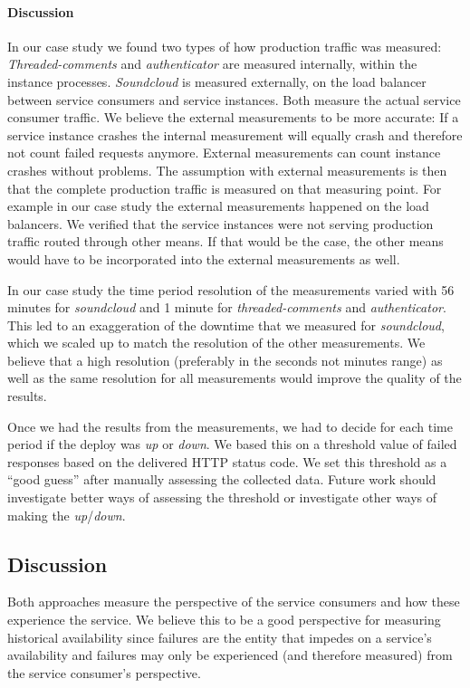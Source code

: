 \paragraph{Discussion}

In our case study we found two types of how production traffic was measured: \emph{Threaded-comments} and \emph{authenticator} are measured internally, within the instance processes. \emph{Soundcloud} is measured externally, on the load balancer between service consumers and service instances. Both measure the actual service consumer traffic. We believe the external measurements to be more accurate: If a service instance crashes the internal measurement will equally crash and therefore not count failed requests anymore. External measurements can count instance crashes without problems. The assumption with external measurements is then that the complete production traffic is measured on that measuring point. For example in our case study the external measurements happened on the load balancers. We verified that the service instances were not serving production traffic routed through other means. If that would be the case, the other means would have to be incorporated into the external measurements as well.

In our case study the time period resolution of the measurements varied with 56 minutes for \emph{soundcloud} and 1 minute for \emph{threaded-comments} and \emph{authenticator}. This led to an exaggeration of the downtime that we measured for \emph{soundcloud}, which we scaled up to match the resolution of the other measurements. We believe that a high resolution (preferably in the seconds not minutes range) as well as the same resolution for all measurements would improve the quality of the results.

Once we had the results from the measurements, we had to decide for each time period if the deploy was \emph{up} or \emph{down}. We based this on a threshold value of failed responses based on the delivered HTTP status code. We set this threshold as a ``good guess'' after manually assessing the collected data. Future work should investigate better ways of assessing the threshold or investigate other ways of making the \emph{up}/\emph{down}.

\subsection{Discussion}
\label{subsubsec:measure_discussion}

Both approaches measure the perspective of the service consumers and how these experience the service. We believe this to be a good perspective for measuring historical availability since failures are the entity that impedes on a service's availability and failures may only be experienced (and therefore measured) from the service consumer's perspective.

